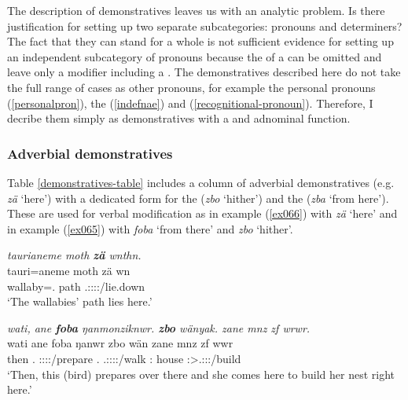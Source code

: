 The description of demonstratives leaves us with an analytic problem. Is there justification for setting up two separate subcategories:  pronouns and  determiners? The fact that they can stand for a whole  is not sufficient evidence for setting up an independent subcategory of  pronouns because the  of a  can be omitted and leave only a modifier including a  . The demonstratives described here do not take the full range of cases as other pronouns, for example the personal pronouns (\ref{personalpron}), the  (\ref{indefnae}) and   (\ref{recognitional-pronoun}). Therefore, I decribe them simply as demonstratives with a  and adnominal function.

\subsubsection{Adverbial demonstratives} \label{demadv}

Table \ref{demonstratives-table} includes a column of adverbial demonstratives (e.g. \emph{zä} `here') with a dedicated form for the  (\emph{zbo} `hither') and the   (\emph{zba} `from here'). These are used for verbal modification as in example (\ref{ex066}) with \emph{zä} `here' and in example (\ref{ex065}) with \emph{foba} `from there' and \emph{zbo} `hither'.

\begin{exe}
	\ex \emph{taurianeme moth \textbf{zä} wnthn.}\\
	\gll tauri=aneme moth zä wn\\
	wallaby=\Poss.\Nsg{} path \Prox{} \Tsg.\F:\Sbj:\Nonpast:\Ipfv:\Venit/lie.down\\
	\trans `The wallabies' path lies here.' 
	\label{ex066}
\end{exe}
\begin{exe}
	\ex \emph{wati, ane \textbf{foba} ŋanmonziknwr. \textbf{zbo} wänyak. zane mnz zf wrwr.}\\
	\gll wati ane foba ŋanwr zbo wän zane mnz zf wwr\\
	then \Dem{} \Dist.\Abl{} \Stsg:\Sbj:\Nonpast:\Ipfv:\Venit/prepare \Prox.\All{} \Tsg.\F:\Sbj:\Nonpast:\Ipfv:\Venit/walk \Dem:\Prox{} house \Imm{} \Stsg:\Sbj>\Tsg.\F:\Obj:\Nonpast:\Ipfv/build\\
	\trans `Then, this (bird) prepares over there and she comes here to build her nest right here.' 
	\label{ex065}
\end{exe}

